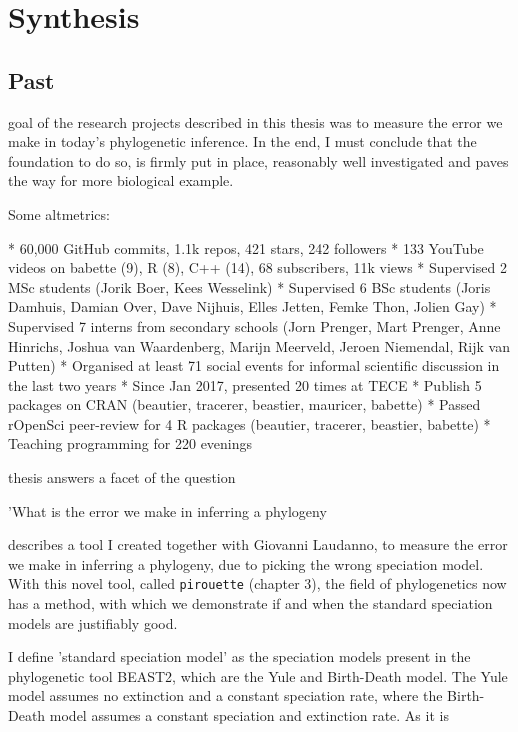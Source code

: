 \chapter{Synthesis}
\label{synthesis}
\newpage

\section{Past}

\noindent

 goal of the research projects
described in this thesis 
was to measure the error we make in today's phylogenetic inference.
In the end, I must conclude that the foundation to do so, is firmly 
put in place, reasonably well investigated and paves the way for
more biological example.

Some altmetrics:

 * 60,000 GitHub commits, 1.1k repos, 421 stars, 242 followers
 * 133 YouTube videos on babette (9), R (8), C++ (14), 68 subscribers, 11k views
 * Supervised 2 MSc students (Jorik Boer, Kees Wesselink)
 * Supervised 6 BSc students (Joris Damhuis, 
   Damian Over, Dave Nijhuis, Elles Jetten, Femke Thon, Jolien Gay)
 * Supervised 7 interns from secondary schools (Jorn Prenger, Mart Prenger, 
   Anne Hinrichs, Joshua van Waardenberg, Marijn Meerveld, Jeroen Niemendal, 
   Rijk van Putten)
 * Organised at least 71 social events for informal scientific discussion
   in the last two years
 * Since Jan 2017, presented 20 times at TECE
 * Publish 5 packages on CRAN (beautier, tracerer, beastier, mauricer, babette)
 * Passed rOpenSci peer-review for 4 R packages (beautier, tracerer, beastier, babette)
 * Teaching programming for 220 evenings



 thesis answers a facet of the question 


'What is the error we make in inferring a phylogeny

describes a tool I created together with Giovanni Laudanno, 
to measure the error we make in inferring a phylogeny, due to
picking the wrong speciation model. 
With this novel tool, called \verb;pirouette; (chapter 3),
the field of phylogenetics now has a method, 
with which we demonstrate if and when the standard speciation models
are justifiably good. 

I define 'standard speciation model' as the speciation models 
present in the phylogenetic tool BEAST2, which are the Yule and
Birth-Death model. The Yule model assumes no extinction
and a constant speciation rate, where the Birth-Death model
assumes a constant speciation and extinction rate. As
it is 

